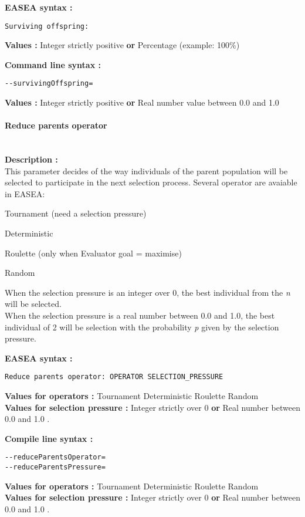 \documentclass{book}
\begin{document}
\textbf{EASEA syntax :}

\texttt{Surviving~offspring:}

\textbf{Values :} Integer strictly positive \textbf{or} Percentage
(example: 100\%)

\textbf{Command line syntax :}

\texttt{-{}-survivingOffspring=}

\textbf{Values :} Integer strictly positive \textbf{or} Real number
value between 0.0 and 1.0

\paragraph{Reduce parents operator}\label{reduce-parents-operator}
~\\

\textbf{Description :}\\This parameter decides of the way individuals of
the parent population will be selected to participate in the next
selection process. Several operator are avaiable in EASEA:

Tournament (need a selection pressure)

Deterministic

Roulette (only when Evaluator goal = maximise)

Random

When the selection pressure is an integer over 0, the best individual
from the \emph{n} will be selected.\\When the selection pressure is a
real number between 0.0 and 1.0, the best individual of 2 will be
selection with the probability \emph{p} given by the selection pressure.

\textbf{EASEA syntax :}

\texttt{Reduce~parents~operator:~OPERATOR~SELECTION\_PRESSURE}

\textbf{Values for operators :} Tournament Deterministic Roulette
Random\\\textbf{Values for selection pressure :} Integer strictly over 0
\textbf{or} Real number between 0.0 and 1.0 .

\textbf{Compile line syntax :}

\texttt{-{}-reduceParentsOperator=}\\\texttt{-{}-reduceParentsPressure=}

\textbf{Values for operators :} Tournament Deterministic Roulette
Random\\\textbf{Values for selection pressure :} Integer strictly over 0
\textbf{or} Real number between 0.0 and 1.0 .
\end{document}
